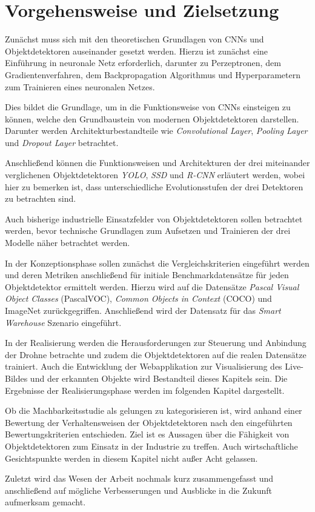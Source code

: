 \section{Vorgehensweise und Zielsetzung}

Zunächst muss sich mit den theoretischen Grundlagen von CNNs und Objektdetektoren auseinander gesetzt werden. Hierzu ist zunächst eine Einführung in neuronale Netz erforderlich, darunter zu Perzeptronen, dem Gradientenverfahren, dem Backpropagation Algorithmus und Hyperparametern zum Trainieren eines neuronalen Netzes. 

Dies bildet die Grundlage, um in die Funktionsweise von CNNs einsteigen zu können, welche den Grundbaustein von modernen Objektdetektoren darstellen. Darunter werden Architekturbestandteile wie \textit{Convolutional Layer}, \textit{Pooling Layer} und \textit{Dropout Layer} betrachtet. 

Anschließend können die Funktionsweisen und Architekturen der drei miteinander verglichenen Objektdetektoren \textit{YOLO}, \textit{SSD} und \textit{R-CNN} erläutert werden, wobei hier zu bemerken ist, dass unterschiedliche Evolutionsstufen der drei Detektoren zu betrachten sind. 

Auch bisherige industrielle Einsatzfelder von Objektdetektoren sollen betrachtet werden, bevor technische Grundlagen zum Aufsetzen und Trainieren der drei Modelle näher betrachtet werden. 

In der Konzeptionsphase sollen zunächst die Vergleichskriterien eingeführt werden und deren Metriken anschließend für initiale Benchmarkdatensätze für jeden Objektdetektor ermittelt werden. Hierzu wird auf die Datensätze \textit{Pascal Visual Object Classes} (PascalVOC), \textit{Common Objects in Context} (COCO) und ImageNet zurückgegriffen. Anschließend wird der Datensatz für das \textit{Smart Warehouse} Szenario eingeführt. 

In der Realisierung werden die Herausforderungen zur Steuerung und Anbindung der Drohne betrachte und zudem die Objektdetektoren auf die realen Datensätze trainiert. Auch die Entwicklung der Webapplikation zur Visualisierung des Live-Bildes und der erkannten Objekte wird Bestandteil dieses Kapitels sein. Die Ergebnisse der Realisierungsphase werden im folgenden Kapitel dargestellt. 

Ob die Machbarkeitsstudie als gelungen zu kategorisieren ist, wird anhand einer Bewertung der Verhaltensweisen der Objektdetektoren nach den eingeführten Bewertungskriterien entschieden. Ziel ist es Aussagen über die Fähigkeit von Objektdetektoren zum Einsatz in der Industrie zu treffen. Auch wirtschaftliche Gesichtspunkte werden in diesem Kapitel nicht außer Acht gelassen. 

Zuletzt wird das Wesen der Arbeit nochmals kurz zusammengefasst und anschließend auf mögliche Verbesserungen und Ausblicke in die Zukunft aufmerksam gemacht. 

